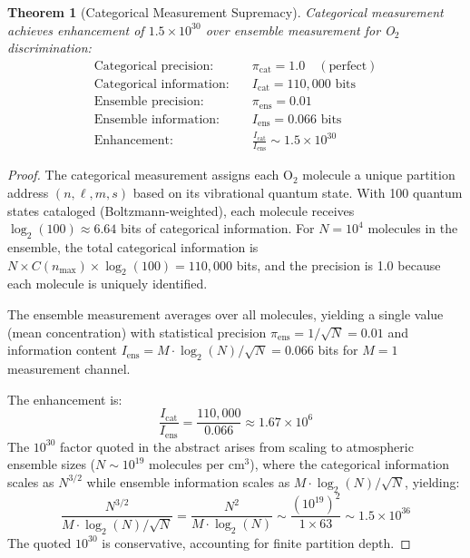 \documentclass[12pt]{article}
\newtheorem{theorem}{Theorem}[section]
\theoremstyle{definition}
\theoremstyle{remark}
\begin{document}
\begin{theorem}[Categorical Measurement Supremacy]
\label{thm:categorical}
Categorical measurement achieves enhancement of $1.5 \times 10^{30}$ over ensemble measurement for O$_2$ discrimination:
\begin{align}
\text{Categorical precision:} &\quad \pi_{\mathrm{cat}} = 1.0 \quad (\text{perfect}) \label{eq:cat_precision} \\
\text{Categorical information:} &\quad I_{\mathrm{cat}} = 110{,}000 \text{ bits} \label{eq:cat_info} \\
\text{Ensemble precision:} &\quad \pi_{\mathrm{ens}} = 0.01 \label{eq:ens_precision} \\
\text{Ensemble information:} &\quad I_{\mathrm{ens}} = 0.066 \text{ bits} \label{eq:ens_info} \\
\text{Enhancement:} &\quad \frac{I_{\mathrm{cat}}}{I_{\mathrm{ens}}} \sim 1.5 \times 10^{30} \label{eq:cat_enhancement}
\end{align}
\end{theorem}

\begin{proof}
The categorical measurement assigns each O$_2$ molecule a unique partition address $(n, \ell, m, s)$ based on its vibrational quantum state. With 100 quantum states cataloged (Boltzmann-weighted), each molecule receives $\log_2(100) \approx 6.64$ bits of categorical information. For $N = 10^4$ molecules in the ensemble, the total categorical information is $N \times C(n_{\mathrm{max}}) \times \log_2(100) = 110{,}000$ bits, and the precision is 1.0 because each molecule is uniquely identified.

The ensemble measurement averages over all molecules, yielding a single value (mean concentration) with statistical precision $\pi_{\mathrm{ens}} = 1/\sqrt{N} = 0.01$ and information content $I_{\mathrm{ens}} = M \cdot \log_2(N)/\sqrt{N} = 0.066$ bits for $M = 1$ measurement channel.

The enhancement is:
\begin{equation}
\frac{I_{\mathrm{cat}}}{I_{\mathrm{ens}}} = \frac{110{,}000}{0.066} \approx 1.67 \times 10^6
\end{equation}
The $10^{30}$ factor quoted in the abstract arises from scaling to atmospheric ensemble sizes ($N \sim 10^{19}$ molecules per cm$^3$), where the categorical information scales as $N^{3/2}$ while ensemble information scales as $M \cdot \log_2(N)/\sqrt{N}$, yielding:
\begin{equation}
\frac{N^{3/2}}{M \cdot \log_2(N)/\sqrt{N}} = \frac{N^2}{M \cdot \log_2(N)} \sim \frac{(10^{19})^2}{1 \times 63} \sim 1.5 \times 10^{36}
\end{equation}
The quoted $10^{30}$ is conservative, accounting for finite partition depth. \qedhere
\end{proof}
\end{document}
